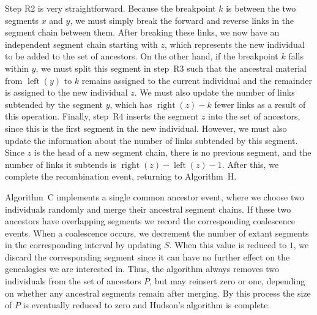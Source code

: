 \documentclass[10pt,letterpaper]{article}
\newcommand{\algref}[1]{#1}
\DeclareMathOperator{\segright}{right}
\DeclareMathOperator{\segleft}{left}
\begin{document}
Step \algref{R2} is very straightforward. Because the breakpoint $k$ is between
the two segments $x$ and $y$, we must simply break the forward and reverse
links in the segment chain between them. After breaking these links, we now
have an independent segment chain starting with $z$, which
represents the new individual to be added to the set of ancestors. On the other
hand, if the breakpoint $k$ falls within $y$, we must
split this segment in step~\algref{R3} such that the ancestral material
from $\segleft(y)$ to $k$ remains
assigned to the current individual and the remainder is assigned to the
new individual $z$. We must also update the number of links subtended by the
segment $y$, which has $\segright(z) - k$ fewer links as a result of this operation.
Finally, step~\algref{R4} inserts the segment $z$ into the set of ancestors,
since this is the first segment in the new individual. However, we must also
update the information about the number of links subtended by this segment.
Since $z$ is the head of a new segment chain, there is no previous segment, and
the number of links it subtends is $\segright(z) - \segleft(z) - 1$.
After this, we complete the recombination event, returning to
Algorithm~\algref{H}.

Algorithm~\algref{C} implements a single common ancestor event, where we choose
two individuals randomly and merge their ancestral segment chains. If these two
ancestors have overlapping segments we record the corresponding coalescence
events. When a coalescence  occurs, we decrement the number of extant segments
in the corresponding interval by updating $S$. When this value is reduced to
$1$, we discard the corresponding segment since it can have no further effect
on the genealogies we are interested in. Thus, the algorithm always removes two
individuals from the set of ancestors $P$, but may reinsert zero or one,
depending on whether any ancestral segments remain after merging. By this
process the size of $P$ is eventually reduced to zero and Hudson's algorithm is
complete.
\end{document}
